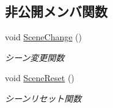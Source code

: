 \subsection*{非公開メンバ関数}
\begin{DoxyCompactItemize}
\item 
void \mbox{\hyperlink{class_scene_manager_ab1ffc5d84cf812e4105cba755d034770}{Scene\+Change}} ()
\begin{DoxyCompactList}\small\item\em シーン変更関数 \end{DoxyCompactList}\item 
void \mbox{\hyperlink{class_scene_manager_a0652a81c7baff52add9ec4b13205865c}{Scene\+Reset}} ()
\begin{DoxyCompactList}\small\item\em シーンリセット関数 \end{DoxyCompactList}\end{DoxyCompactItemize}
